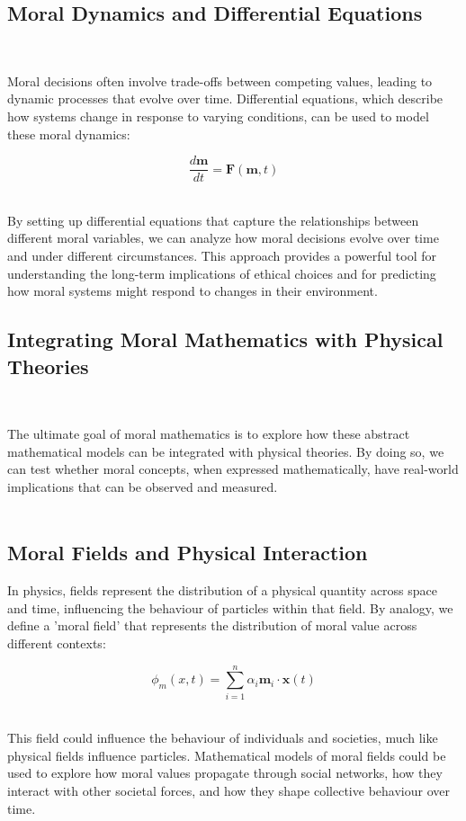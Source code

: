 \documentclass{article}
\begin{document}
\subsection{Moral Dynamics and Differential Equations}
\

Moral decisions often involve trade-offs between competing values, leading to dynamic processes that evolve over time. Differential equations, which describe how systems change in response to varying conditions, can be used to model these moral dynamics:

\[
\frac{d\mathbf{m}}{dt} = \mathbf{F}(\mathbf{m}, t)
\]
\

By setting up differential equations that capture the relationships between different moral variables, we can analyze how moral decisions evolve over time and under different circumstances. This approach provides a powerful tool for understanding the long-term implications of ethical choices and for predicting how moral systems might respond to changes in their environment.

\subsection{Integrating Moral Mathematics with Physical Theories}
\

The ultimate goal of moral mathematics is to explore how these abstract mathematical models can be integrated with physical theories. By doing so, we can test whether moral concepts, when expressed mathematically, have real-world implications that can be observed and measured.
\\
\
\subsection{Moral Fields and Physical Interaction}

In physics, fields represent the distribution of a physical quantity across space and time, influencing the behaviour of particles within that field. By analogy, we define a 'moral field' that represents the distribution of moral value across different contexts:

\[
\phi_m(x, t) = \sum_{i=1}^{n} \alpha_i \mathbf{m}_i \cdot \mathbf{x}(t)
\]
\

This field could influence the behaviour of individuals and societies, much like physical fields influence particles. Mathematical models of moral fields could be used to explore how moral values propagate through social networks, how they interact with other societal forces, and how they shape collective behaviour over time.
\\
\end{document}
